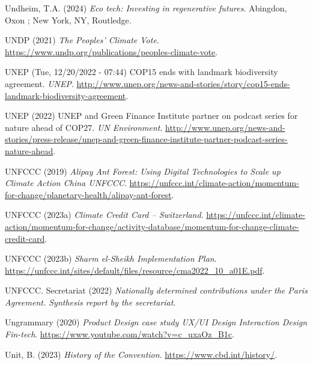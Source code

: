 \documentclass[
  letterpaper,
  DIV=11,
  numbers=noendperiod]{scrartcl}
\newlength{\cslhangindent}
\newenvironment{CSLReferences}[2] %
 {\begin{list}{}{%
  \setlength{\itemindent}{0pt}
  \setlength{\leftmargin}{0pt}
  \setlength{\parsep}{0pt}
  \ifodd #1
   \setlength{\leftmargin}{\cslhangindent}
   \setlength{\itemindent}{-1\cslhangindent}
  \fi
  \setlength{\itemsep}{#2\baselineskip}}}
 {\end{list}}
\begin{document}
\begin{CSLReferences}{0}{1}
Undheim, T.A. (2024) \emph{Eco tech: Investing in regenerative futures}.
Abingdon, Oxon ; New York, NY, Routledge.

UNDP (2021) \emph{The {Peoples}' {Climate Vote}}.
\url{https://www.undp.org/publications/peoples-climate-vote}.

UNEP (Tue, 12/20/2022 - 07:44) {COP15} ends with landmark biodiversity
agreement. \emph{UNEP}.
\url{http://www.unep.org/news-and-stories/story/cop15-ends-landmark-biodiversity-agreement}.

UNEP (2022) {UNEP} and {Green Finance Institute} partner on podcast
series for nature ahead of {COP27}. \emph{UN Environment}.
\url{http://www.unep.org/news-and-stories/press-release/unep-and-green-finance-institute-partner-podcast-series-nature-ahead}.

UNFCCC (2019) \emph{Alipay {Ant Forest}: {Using Digital Technologies} to
{Scale} up {Climate Action} {\textbar} {China} {\textbar} {UNFCCC}}.
\url{https://unfccc.int/climate-action/momentum-for-change/planetary-health/alipay-ant-forest}.

UNFCCC (2023a) \emph{Climate {Credit Card} -- {Switzerland}}.
\url{https://unfccc.int/climate-action/momentum-for-change/activity-database/momentum-for-change-climate-credit-card}.

UNFCCC (2023b) \emph{Sharm el-{Sheikh Implementation Plan}}.
\url{https://unfccc.int/sites/default/files/resource/cma2022_10_a01E.pdf}.

UNFCCC. Secretariat (2022) \emph{Nationally determined contributions
under the {Paris Agreement}. {Synthesis} report by the secretariat}.

Ungrammary (2020) \emph{Product {Design} case study {\textbar} {UX}/{UI
Design} {\textbar} {Interaction Design} {\textbar} {Fin-tech}}.
\url{https://www.youtube.com/watch?v=c_uxaOz_B1c}.

Unit, B. (2023) \emph{History of the {Convention}}.
\url{https://www.cbd.int/history/}.


\end{CSLReferences}
\end{document}

